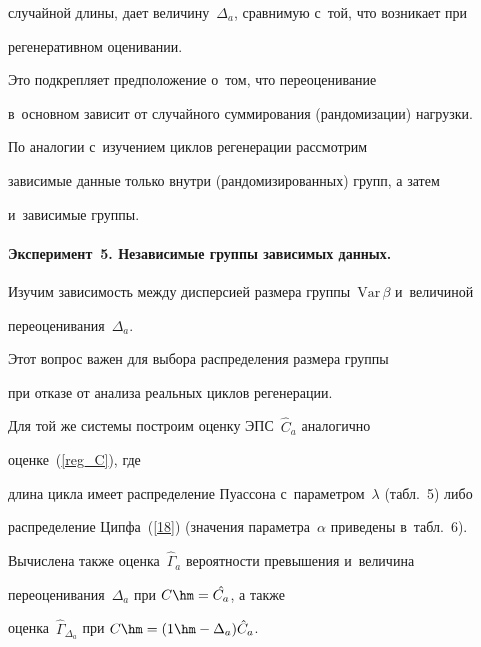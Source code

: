 случайной длины, дает величину~${\Delta}_{a}$, сравнимую с~той, что возникает при 


регенеративном оценивании.


Это подкрепляет предположение о~том, что переоценивание


в~основном  зависит от случайного суммирования (рандомизации) нагрузки.





По аналогии с~изучением циклов регенерации  рассмотрим


 зависимые  данные  только   внутри (рандомизированных) групп, а затем  


 и~зависимые  группы. 


 


 \vspace*{-3pt}








\paragraph*{Эксперимент~5. Независимые группы зависимых данных.}


Изучим  зависимость между дисперсией размера  группы~$\mathrm{Var}\, \beta$ и~величиной 


переоценивания~${\Delta}_{a}$.


Этот вопрос важен для выбора распределения  размера  группы


при отказе от анализа реальных циклов регенерации.


Для той же  системы  построим оценку ЭПС~${\hat C}_{a}$  аналогично 


оценке~(\ref{reg_C}), где


длина цикла имеет распределение Пуассона с~параметром~$\lambda$ (табл.~5) либо  


распределение Ципфа~(\ref{18}) (значения параметра~$\alpha$ приведены  в~табл.~6).


Вычислена также  оценка~${\hat\Gamma}_{a}$ вероятности превышения и~величина 


переоценивания~${\Delta}_{a}$ при $C\hm=\hat{C_{a}}$,  а также  


оценка~${\hat\Gamma}_{{\Delta}_{a}}$ при $C\hm= (1\hm-{\Delta}_{a}){\hat C}_{a}$.





